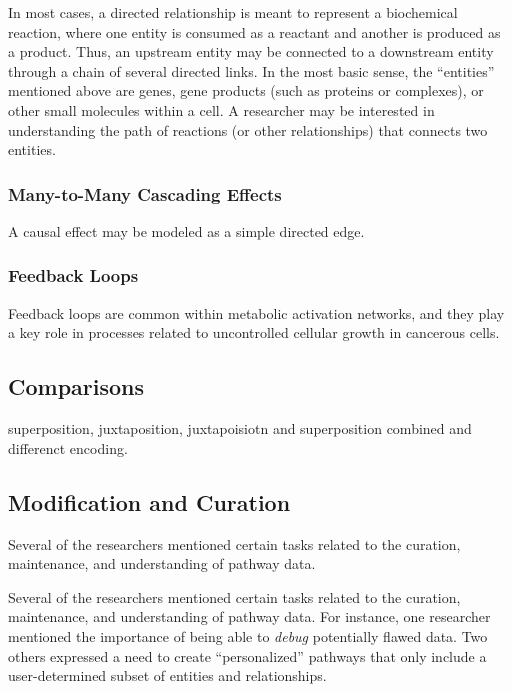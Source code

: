 \documentclass[journal]{vgtc}                %
\begin{document}
In most cases, a directed relationship is meant to represent a biochemical reaction, where one entity is consumed as a reactant and another is produced as a product.
Thus, an upstream entity may be connected to a downstream entity through a chain of several directed links.
In the most basic sense, the ``entities'' mentioned above are genes, gene products (such as proteins or complexes), or other small molecules within a cell.
A researcher may be interested in understanding the path of reactions (or other relationships) that connects two entities.

\subsubsection{Many-to-Many Cascading Effects}

A causal effect may be modeled as a simple directed edge.


\subsubsection{Feedback Loops}

Feedback loops are common within metabolic activation networks, and they play a key role in processes related to uncontrolled cellular growth in cancerous cells.

\subsection{Comparisons}

superposition, juxtaposition, juxtapoisiotn and superposition combined and differenct encoding.

\subsection{Modification and Curation}

Several of the researchers mentioned certain tasks related to the curation, maintenance, and understanding of pathway data.

Several of the researchers mentioned certain tasks related to the curation, maintenance, and understanding of pathway data. For instance, one researcher mentioned the importance of being able to \emph{debug} potentially flawed data. Two others expressed a need to create ``personalized'' pathways that only include a user-determined subset of entities and relationships.
\end{document}
